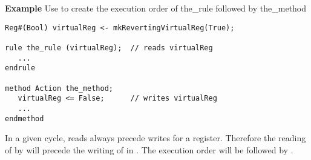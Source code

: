 {\bf Example}
Use  to create the
execution order of  the\_rule followed by the\_method

\begin{verbatim}
Reg#(Bool) virtualReg <- mkRevertingVirtualReg(True);

rule the_rule (virtualReg);  // reads virtualReg
   ...
endrule

method Action the_method;
   virtualReg <= False;      // writes virtualReg
   ...
endmethod
\end{verbatim}

In a given cycle, reads always precede writes for a register.
Therefore the reading of  by 
will precede the writing of  in .  
The execution order will be  followed by .
